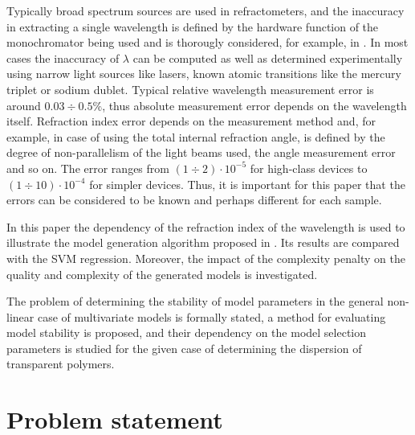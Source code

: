 \documentclass[11pt,a4paper]{article}
\theoremstyle{definition}
\begin{document}
Typically broad spectrum sources are used in refractometers, and the
inaccuracy in extracting a single wavelength is defined by the hardware function
of the monochromator being used and is thorougly considered, for example, in
\cite{Malishev79,Zaidel72}. In most cases the inaccuracy of $\lambda$ can be
computed as well as determined experimentally using narrow light sources like
lasers, known atomic transitions like the mercury triplet or sodium dublet.
Typical relative wavelength measurement error is around $0.03 \div 0.5\%$,
thus absolute measurement error depends on the wavelength itself. Refraction
index error depends on the measurement method and, for example,
in case of using the total internal refraction angle, is defined by the degree
of non-parallelism of the light beams used, the angle measurement error
and so on. The error ranges from $(1 \div 2) \cdot 10^{-5}$ for high-class
devices to $(1 \div 10) \cdot 10^{-4}$ for simpler devices. Thus, it is important
for this paper that the errors can be considered to be known and perhaps
different for each sample.

In this paper the dependency of the refraction index of the wavelength is used
to illustrate the model generation algorithm proposed in \cite{Rudoy13}.
Its results are compared with the SVM regression. Moreover, the impact of the
complexity penalty on the quality and complexity of the generated models
is investigated.

The problem of determining the stability of model parameters
in the general non-linear case of multivariate models is formally stated, a method for evaluating
model stability is proposed, and their dependency on the model selection
parameters is studied for the given case of determining the dispersion
of transparent polymers.

\section{Problem statement}
\label{sect:prob_stat}
\end{document}
